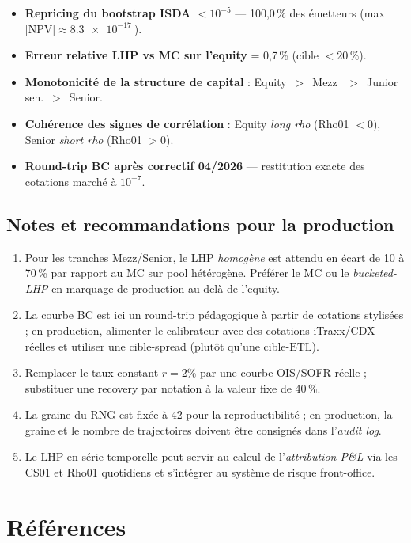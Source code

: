 \documentclass[11pt,a4paper]{article}
\newcommand{\ETL}{\mathrm{ETL}}
\begin{document}
\begin{itemize}
\item[\checkmark] \textbf{Repricing du bootstrap ISDA $< 10^{-5}$} --- 100,0\,\% des
émetteurs (max $|\text{NPV}| \approx \SI{8.3e-17}{}$).
\item[\checkmark] \textbf{Erreur relative LHP vs MC sur l'equity} = 0,7\,\%
(cible $< 20\,\%$).
\item[\checkmark] \textbf{Monotonicité de la structure de capital} : Equity~$>$~Mezz
~$>$~Junior sen.~$>$~Senior.
\item[\checkmark] \textbf{Cohérence des signes de corrélation} : Equity \emph{long
rho} (Rho01 $< 0$), Senior \emph{short rho} (Rho01 $> 0$).
\item[\checkmark] \textbf{Round-trip BC après correctif 04/2026} --- restitution
exacte des cotations marché à $10^{-7}$.
\end{itemize}

\subsection*{Notes et recommandations pour la production}

\begin{enumerate}
\item Pour les tranches Mezz/Senior, le LHP \emph{homogène} est attendu en
écart de 10 à 70\,\% par rapport au MC sur pool hétérogène. Préférer le MC ou
le \emph{bucketed-LHP} en marquage de production au-delà de l'equity.
\item La courbe BC est ici un round-trip pédagogique à partir de cotations
stylisées ; en production, alimenter le calibrateur avec des cotations
iTraxx/CDX réelles et utiliser une cible-spread (plutôt qu'une cible-$\ETL$).
\item Remplacer le taux constant $r = 2\%$ par une courbe OIS/SOFR réelle ;
substituer une recovery par notation à la valeur fixe de 40\,\%.
\item La graine du RNG est fixée à 42 pour la reproductibilité ; en production,
la graine et le nombre de trajectoires doivent être consignés dans l'\emph{audit
log}.
\item Le LHP en série temporelle peut servir au calcul de l'\emph{attribution
P\&L} via les CS01 et Rho01 quotidiens et s'intégrer au système de risque
front-office.
\end{enumerate}

\section*{Références}
\end{document}
